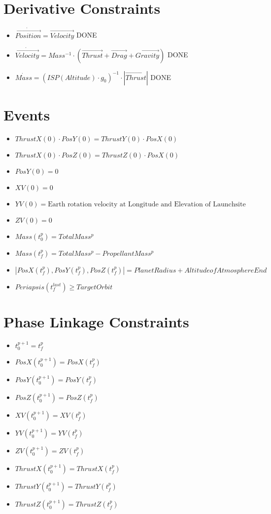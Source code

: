 \documentclass[11pt]{report}
\newcommand{\DONE}{{DONE}}
\begin{document}
\section{Derivative Constraints}

\begin{itemize}
\item $\dot{\overrightarrow{Position}} = \overrightarrow{Velocity}$ \DONE
\item $\dot{\overrightarrow{Velocity}} = Mass^{-1}\cdot\left(\overrightarrow{Thrust} + \overrightarrow{Drag} + \overrightarrow{Gravity}\right)$ \DONE
\item $\dot{Mass} = (ISP(Altitude) \cdot g_0)^{-1}\cdot\left|\overrightarrow{Thrust}\right|$ \DONE
\end{itemize}
\section{Events}

\begin{itemize}
\item $ThrustX(0) \cdot PosY(0) = ThrustY(0) \cdot PosX(0)$
\item $ThrustX(0) \cdot PosZ(0) = ThrustZ(0) \cdot PosX(0)$
\item $PosY(0) = 0$
\item $XV(0) = 0$
\item $YV(0) = \textrm{Earth rotation velocity at Longitude and Elevation of Launchsite}$
\item $ZV(0) = 0$
\item $Mass(t_0^p) = TotalMass^p$
\item $Mass(t_f^p) = TotalMass^p - PropellantMass^p$
\item $\left|PosX(t_f^p), PosY(t_f^p), PosZ(t_f^p)\right| = PlanetRadius + Altitude of Atmosphere End$
\item $Periapsis(t_f^{last}) \geq TargetOrbit$
\end{itemize}

\section{Phase Linkage Constraints}

\begin{itemize}
\item $t_0^{p+1} = t_f^p$
\item $PosX(t_0^{p+1}) = PosX(t_f^p)$
\item $PosY(t_0^{p+1}) = PosY(t_f^p)$
\item $PosZ(t_0^{p+1}) = PosZ(t_f^p)$
\item $XV(t_0^{p+1}) = XV(t_f^p)$
\item $YV(t_0^{p+1}) = YV(t_f^p)$
\item $ZV(t_0^{p+1}) = ZV(t_f^p)$
\item $ThrustX(t_0^{p+1}) = ThrustX(t_f^p)$
\item $ThrustY(t_0^{p+1}) = ThrustY(t_f^p)$
\item $ThrustZ(t_0^{p+1}) = ThrustZ(t_f^p)$
\end{itemize}
\end{document}
